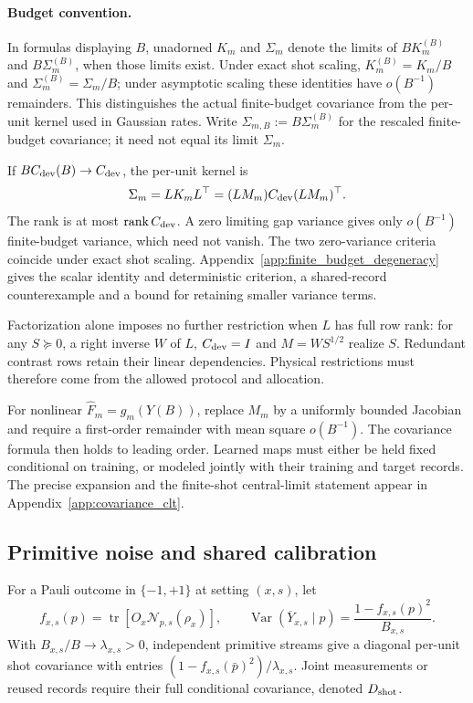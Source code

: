 \documentclass[a4paper,onecolumn,unpublished,nopdfoutputerror]{quantumarticle}
\theoremstyle{plain}
\theoremstyle{definition}
\newcommand{\Var}{\operatorname{Var}}
\newcommand{\tr}{\operatorname{tr}}
\newcommand{\rank}{\operatorname{rank}}
\newcommand{\calN}{\mathcal{N}}
\newcommand{\1}{\mathbf{1}}
\begin{document}
\paragraph{Budget convention.}
In formulas displaying $B$, unadorned $K_m$ and $\Sigma_m$ denote the limits of $BK_m^{(B)}$ and $B\Sigma_m^{(B)}$, when those limits exist. Under exact shot scaling, $K_m^{(B)}=K_m/B$ and $\Sigma_m^{(B)}=\Sigma_m/B$; under asymptotic scaling these identities have $o(B^{-1})$ remainders. This distinguishes the actual finite-budget covariance from the per-unit kernel used in Gaussian rates. Write $\Sigma_{m,B}:=B\Sigma_m^{(B)}$ for the rescaled finite-budget covariance; it need not equal its limit $\Sigma_m$.

If $BC_{\rm dev}(B)\to C_{\rm dev}$, the per-unit kernel is
\begin{equation}\label{eq:qem_pullback_kernel}
\Sigma_m=LK_mL^\top=(LM_m)C_{\rm dev}(LM_m)^\top.
\end{equation}
The rank is at most $\rank C_{\rm dev}$. A zero limiting gap variance gives only $o(B^{-1})$ finite-budget variance, which need not vanish. The two zero-variance criteria coincide under exact shot scaling. Appendix~\ref{app:finite_budget_degeneracy} gives the scalar identity and deterministic criterion, a shared-record counterexample and a bound for retaining smaller variance terms.

Factorization alone imposes no further restriction when $L$ has full row rank: for any $S\succeq0$, a right inverse $W$ of $L$, $C_{\rm dev}=I$ and $M=WS^{1/2}$ realize $S$. Redundant contrast rows retain their linear dependencies. Physical restrictions must therefore come from the allowed protocol and allocation.

For nonlinear $\widehat F_m=g_m(Y(B))$, replace $M_m$ by a uniformly bounded Jacobian and require a first-order remainder with mean square $o(B^{-1})$. The covariance formula then holds to leading order. Learned maps must either be held fixed conditional on training, or modeled jointly with their training and target records. The precise expansion and the finite-shot central-limit statement appear in Appendix~\ref{app:covariance_clt}.

\subsection{Primitive noise and shared calibration}
\label{subsec:anchoring_cdev}
For a Pauli outcome in $\{-1,+1\}$ at setting $(x,s)$, let
\[
f_{x,s}(p)=\tr[O_x\calN_{p,s}(\rho_x)],\qquad
\Var(\overline Y_{x,s}\mid p)=\frac{1-f_{x,s}(p)^2}{B_{x,s}}.
\]
With $B_{x,s}/B\to\lambda_{x,s}>0$, independent primitive streams give a diagonal per-unit shot covariance with entries $(1-f_{x,s}(\bar p)^2)/\lambda_{x,s}$. Joint measurements or reused records require their full conditional covariance, denoted $D_{\rm shot}$.
\end{document}
